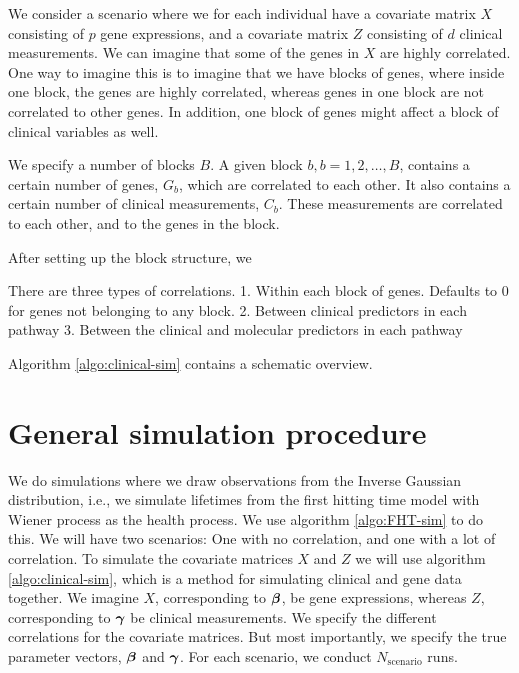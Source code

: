 We consider a scenario where we for each individual have a covariate matrix $X$ consisting of $p$ gene expressions, and a covariate matrix $Z$ consisting of $d$ clinical measurements.
We can imagine that some of the genes in $X$ are highly correlated.
One way to imagine this is to imagine that we have blocks of genes,
where inside one block, the genes are highly correlated, whereas genes in one block are not correlated to other genes.
In addition, one block of genes might affect a block of clinical variables as well.

We specify a number of blocks $B$. A given block $b,b=1,2,\ldots,B$, contains a certain number of genes, $G_b$, which are correlated to each other.
It also contains a certain number of clinical measurements, $C_b$. These measurements are correlated to each other, and to the genes in the block.

After setting up the block structure, we 

There are three types of correlations.
1. Within each block of genes. Defaults to 0 for genes not belonging to any block.
2. Between clinical predictors in each pathway
3. Between the clinical and molecular predictors in each pathway

Algorithm \ref{algo:clinical-sim} contains a schematic overview.


\section{General simulation procedure}
We do simulations where we draw observations from the Inverse Gaussian distribution, i.e., we simulate lifetimes from the first hitting time model with Wiener process as the health process.
We use algorithm \ref{algo:FHT-sim} to do this.
We will have two scenarios: One with no correlation, and one with a lot of correlation.
To simulate the covariate matrices $X$ and $Z$ we will use algorithm \eqref{algo:clinical-sim}, which is a method for simulating clinical and gene data together.
We imagine $X$, corresponding to $\boldsymbol{\beta}$, be gene expressions, whereas $Z$, corresponding to $\boldsymbol{\gamma}$ be clinical measurements.
We specify the different correlations for the covariate matrices.
But most importantly, we specify the true parameter vectors, $\boldsymbol{\beta}$ and $\boldsymbol{\gamma}$.
For each scenario, we conduct $N_{\text{scenario}}$ runs.

